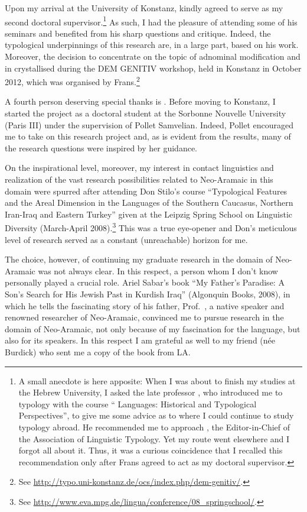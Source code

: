 Upon my arrival at the University of Konstanz,  kindly agreed to serve as my second doctoral supervisor.\footnote{A small anecdote is here apposite: When I was about to finish my studies at the Hebrew University, I asked the late professor , who introduced me to typology with the course \enquote{ Languages: Historical and Typological Perspectives}, to give me some advice as to where I could continue to study typology abroad. He recommended me to approach , the Editor-in-Chief of the Association of Linguistic Typology. Yet my route went elsewhere and I forgot all about it. Thus, it was a curious coincidence that I recalled this recommendation only after Frans agreed to act as my doctoral supervisor.} As such, I had the pleasure of attending some of his seminars and benefited from his sharp questions and critique. Indeed, the typological underpinnings of this research are, in a large part, based on his work. Moreover, the decision to concentrate on the topic of adnominal modification and  in  crystallised during the DEM GENITIV workshop, held in Konstanz in October 2012, which was organised by Frans.\footnote{See \url{http://typo.uni-konstanz.de/ocs/index.php/dem-genitiv/}.}

A fourth person deserving special thanks is . Before moving to Konstanz, I started the project as a doctoral student at the Sorbonne Nouvelle University (Paris III) under the supervision of Pollet Samvelian. Indeed, Pollet encouraged me to take on this research project and, as is evident from the results, many of the research questions were inspired by her guidance.

On the inspirational level, moreover, my interest in contact linguistics and  realization of the vast research possibilities related to Neo-Aramaic in this domain were spurred after attending Don Stilo's course \enquote{Typological Features and the Areal Dimension
in the Languages of the Southern Caucasus, Northern Iran-Iraq and Eastern Turkey} given at the Leipzig Spring School on Linguistic Diversity (March-April 2008).\footnote{See \url{http://www.eva.mpg.de/lingua/conference/08_springschool/}.} This was a true eye-opener and Don's meticulous level of research served as a constant (unreachable) horizon for me. 

The choice, however, of continuing my graduate research in the domain of Neo-Aramaic was not always clear. In this respect, a person whom I don't know personally played a crucial role. Ariel Sabar's book \enquote{My Father's Paradise: A Son's Search for His Jewish Past in Kurdish Iraq} (Algonquin Books, 2008), in which he tells the fascinating story of his father, Prof.\ , a native speaker and renowned researcher of Neo-Aramaic, convinced me to pursue research in the domain of Neo-Aramaic, not only because of my fascination for the language, but also for its speakers. In this respect I am grateful as well to my friend  (née Burdick) who sent me a copy of the book from LA.

